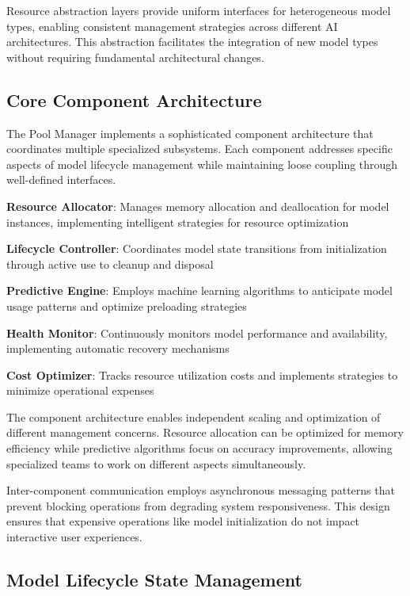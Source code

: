 Resource abstraction layers provide uniform interfaces for heterogeneous model types, enabling consistent management strategies across different AI architectures. This abstraction facilitates the integration of new model types without requiring fundamental architectural changes.

\subsection*{Core Component Architecture}

The Pool Manager implements a sophisticated component architecture that coordinates multiple specialized subsystems. Each component addresses specific aspects of model lifecycle management while maintaining loose coupling through well-defined interfaces.

\begin{expandedlist}
    \item \textbf{Resource Allocator}: Manages memory allocation and deallocation for model instances, implementing intelligent strategies for resource optimization
    \item \textbf{Lifecycle Controller}: Coordinates model state transitions from initialization through active use to cleanup and disposal
    \item \textbf{Predictive Engine}: Employs machine learning algorithms to anticipate model usage patterns and optimize preloading strategies
    \item \textbf{Health Monitor}: Continuously monitors model performance and availability, implementing automatic recovery mechanisms
    \item \textbf{Cost Optimizer}: Tracks resource utilization costs and implements strategies to minimize operational expenses
\end{expandedlist}

The component architecture enables independent scaling and optimization of different management concerns. Resource allocation can be optimized for memory efficiency while predictive algorithms focus on accuracy improvements, allowing specialized teams to work on different aspects simultaneously.

Inter-component communication employs asynchronous messaging patterns that prevent blocking operations from degrading system responsiveness. This design ensures that expensive operations like model initialization do not impact interactive user experiences.

\subsection*{Model Lifecycle State Management}


